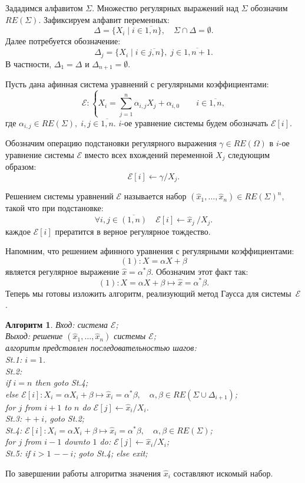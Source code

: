 \documentclass[a4paper]{article} %
\author{Ulysses}
\begin{document}
Зададимся алфавитом $\Sigma$. Множество регулярных выражений над $\Sigma$ обозначим~$RE(\Sigma)$. Зафиксируем алфавит переменных: \[\Delta = \{X_i \mid i \in \overline{1,n}\}, \quad \Sigma \cap \Delta = \emptyset. \]
Далее потребуется обозначение: \[\Delta_j = \{X_i \mid i \in \overline{j,n}\},\; j\in \overline{1,n+1}.\] В частности, $\Delta_1 = \Delta$ и $\Delta_{n+1} = \emptyset$.
\par Пусть дана афинная система уравнений с регулярными коэффициентами:
\[\mathcal{E}: \left\{
X_i = \sum_{j=1}^n \alpha_{i,j} X_j + \alpha_{i,0} \qquad i \in \overline{1,n}
\right., \]
где $\alpha_{i,j} \in RE(\Sigma),\; i,j \in \overline{1,n}$. $i$-ое уравнение системы будем обозначать $\mathcal{E}[i]$. 

Обозначим операцию подстановки регулярного выражения $\gamma \in RE(\Omega)$ в $i$-ое уравнение системы $\mathcal{E}$ вместо всех вхождений переменной $X_j$ следующим образом:
\[\mathcal E[i] \gets \gamma / X_j.\]

Решением системы уравнений $\mathcal E$ называется набор $(\hat{x}_1,\ldots,\hat{x}_n)\in {RE(\Sigma)}^n$, такой что при подстановке: \[
\forall{i,j\in\overline{(1,n)}} \quad \mathcal E[i] \gets \hat{x}_j \ / X_j.
\] каждое $\mathcal E[i]$ прератится в верное регулярное тождество. 

\par Напомним, что решением афинного уравнения с регулярными коэффициентами: \[(1):X = \alpha X + \beta\] является регулярное выражение $\hat{x} = \alpha^*\beta$. Обозначим этот факт так: \[
(1):X = \alpha X + \beta \mapsto \hat{x} = \alpha^*\beta.
\]Теперь мы готовы изложить алгоритм, реализующий метод Гаусса для системы~$\mathcal E$.

\newtheorem{algos}{Алгоритм}
\begin{algos} Вход: система $\mathcal E$;\\
Выход: решение $(\hat{x}_1,\ldots,\hat{x}_n)$ системы $\mathcal E$;\\
алгоритм представлен последовательностью шагов:\\
St.1: $i=1$.\\
St.2:\\if $i=n$ then goto St.4;\\
else $\mathcal E[i]: X_i = \alpha X_i + \beta \mapsto \hat{x}_i = \alpha^*\beta, \quad \alpha, \beta \in RE(\Sigma \cup \Delta_{i+1})$;\\
for $j$ from $i+1$ to $n$ do $\mathcal E[j] \gets \hat{x}_i / X_i$.\\
St.3: $++i$, goto St.2;\\
St.4: $\mathcal E[i]: X_i = \alpha X_i + \beta \mapsto \hat{x}_i = \alpha^*\beta, \quad \alpha, \beta \in RE(\Sigma)$;\\
for $j$ from $i-1$ downto $1$ do: $\mathcal E[j] \gets \hat{x}_i / X_i$;\\
St.5: if $i > 1$ $--i$; goto St.4; else exit;
\end{algos}
По завершении работы алгоритма значения $\hat{x}_i$ составляют искомый набор.
\end{document}
